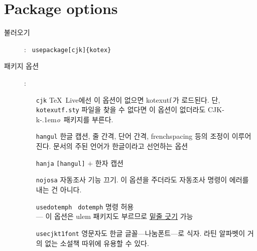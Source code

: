 \documentclass[dvipdfmx,b5paper]{article}
\def\cs#1{\texttt{\color{teal}\char92 #1}}
\def\cjkko{\mbox{CJK-k\kern-.1em\textit{o}}}
\begin{document}
\section{Package options}
  \begin{description}
    \item[불러오기]: \quad\cs{usepackage[cjk]\{kotex\}}
      \medskip
    \item[패키지 옵션]:
      \begin{itemize}
	\item[\texttt{cjk}] \TeX\ Live에선 이 옵션이 없으면 kotexutf\,가
	  로드된다. 단, \verb|kotexutf.sty| 파일을 찾을 수 없다면
	  이 옵션이 없더라도 \cjkko\ 패키지를 부른다.
	\item[\texttt{hangul}] 한글 캡션, 줄 간격, 단어 간격, frenchspacing
	  등의 조정이 이루어진다. 문서의 주된 언어가 한글이라고 선언하는 옵션
	\item[\texttt{hanja}] \verb|[hangul]| $+$ 한자 캡션
	\item[\texttt{nojosa}] 자동조사 기능 끄기. 이 옵션을 주더라도
	  자동조사 명령이 에러를 내는 건 아니다.
	\item[\texttt{usedotemph}] \cs{dotemph} 명령 허용\\
	  --- 이 옵션은 ulem 패키지도 부르므로 \uline{밑줄 긋기} 가능
	\item[\texttt{usecjkt1font}] 영문자도 한글 글꼴---나눔폰트---로 식자.
	   라틴 알파벳이 거의 없는 소설책 따위에 유용할 수 있다.
      \end{itemize}
  \end{description}
\end{document}

